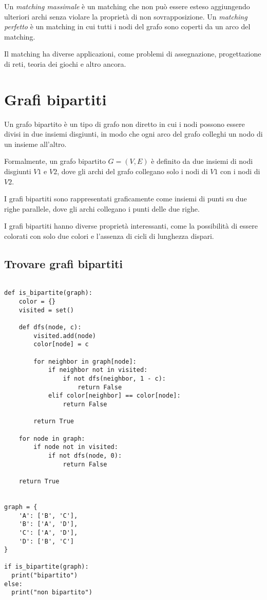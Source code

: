 Un \textit{matching massimale} è un matching che non può essere esteso aggiungendo ulteriori archi senza violare la proprietà di non sovrapposizione. Un \textit{matching perfetto} è un matching in cui tutti i nodi del grafo sono coperti da un arco del matching.

Il matching ha diverse applicazioni, come problemi di assegnazione, progettazione di reti, teoria dei giochi e altro ancora.

\section{Grafi bipartiti}

Un grafo bipartito è un tipo di grafo non diretto in cui i nodi possono essere divisi in due insiemi disgiunti, in modo che ogni arco del grafo colleghi un nodo di un insieme all'altro.

Formalmente, un grafo bipartito $G = (V, E)$ è definito da due insiemi di nodi disgiunti $V1$ e $V2$, dove gli archi del grafo collegano solo i nodi di $V1$ con i nodi di $V2$.

I grafi bipartiti sono rappresentati graficamente come insiemi di punti su due righe parallele, dove gli archi collegano i punti delle due righe.

I grafi bipartiti hanno diverse proprietà interessanti, come la possibilità di essere colorati con solo due colori e l'assenza di cicli di lunghezza dispari.

\subsection{Trovare grafi bipartiti}
\begin{lstlisting}
 
def is_bipartite(graph):
    color = {}
    visited = set()

    def dfs(node, c):
        visited.add(node)
        color[node] = c

        for neighbor in graph[node]:
            if neighbor not in visited:
                if not dfs(neighbor, 1 - c):
                    return False
            elif color[neighbor] == color[node]:
                return False

        return True

    for node in graph:
        if node not in visited:
            if not dfs(node, 0):
                return False

    return True


graph = {
    'A': ['B', 'C'],
    'B': ['A', 'D'],
    'C': ['A', 'D'],
    'D': ['B', 'C']
}

if is_bipartite(graph):
  print("bipartito")
else:
  print("non bipartito")
\end{lstlisting}



